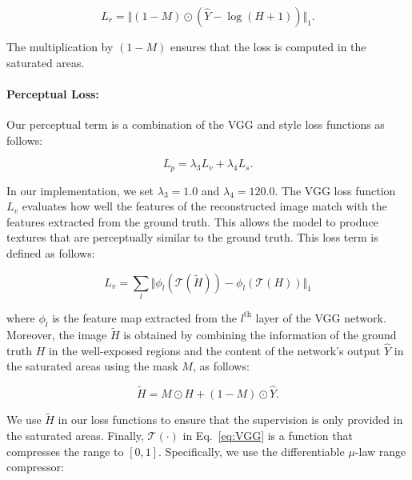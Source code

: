 \vspace{-8pt}
\begin{equation}
    {L}_{r} = \Vert (1-M) \odot (\hat{Y} - \log(H + 1)) \Vert_{1}.
\end{equation}
\vspace{-8pt}

\noindent The multiplication by $(1-M)$ ensures that the loss is computed in the saturated areas.

\paragraph{Perceptual Loss:} Our perceptual term is a combination of the VGG and style loss functions as follows:

\vspace{-8pt}
\begin{equation}
    \label{eqn:hybridloss}
      {L}_{p} = {\lambda}_3 {L}_{v} + {\lambda}_4 {L}_{s}.
\end{equation}
\vspace{-10pt}

In our implementation, we set ${\lambda}_3 = 1.0$ and  ${\lambda}_4 = 120.0$. The VGG loss function ${L}_{v}$ evaluates how well the features of the reconstructed image match with the features extracted from the ground truth. This allows the model to produce textures that are perceptually similar to the ground truth. This loss term is defined as follows:

\vspace{-5pt}
\begin{equation}
\label{eq:VGG}
    {L}_{v} = \sum_{l} \Vert \phi_{l}(\mathcal{T}(\tilde{H})) - \phi_{l}(\mathcal{T}(H)) \Vert_{1}
\end{equation}
\vspace{-5pt}

\noindent where $\phi_l$ is the feature map extracted from the $l^{\text{th}}$ layer of the VGG network. Moreover, the image $\tilde{H}$ is obtained by combining the information of the ground truth $H$ in the well-exposed regions and the content of the network's output $ \hat{Y} $ in the saturated areas using the mask $M$, as follows:

\vspace{-6pt}
\begin{equation}
    \tilde{H} =  M \odot H + (1-M) \odot \hat{Y}.
\end{equation}
\vspace{-6pt}

We use $\tilde{H}$ in our loss functions to ensure that the supervision is only provided in the saturated areas. Finally, $ \mathcal{T}(\cdot) $ in Eq.~\ref{eq:VGG} is a function that compresses the range to $[0, 1]$. Specifically, we use the differentiable $\mu$-law range compressor:

